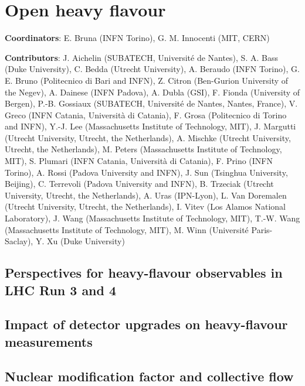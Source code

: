 \documentclass[../report.tex]{subfiles}
\providecommand{\main}{..}
\begin{document}
\clearpage
\section{Open heavy flavour}
\label{sec:HI_HF}

\begin{flushleft}
\textbf{Coordinators}: E. Bruna (INFN Torino), G. M. Innocenti (MIT, CERN)
\end{flushleft}
\textbf{Contributors}: 
J. Aichelin (SUBATECH, Universit\'e de Nantes),
S. A. Bass (Duke University),
C. Bedda (Utrecht University),
A. Beraudo (INFN Torino),
G. E. Bruno (Politecnico di Bari and INFN), 
Z. Citron (Ben-Gurion University of the Negev),
A. Dainese (INFN Padova),
A. Dubla (GSI),
F. Fionda (University of Bergen),
P.-B. Gossiaux (SUBATECH, Universit\'e de Nantes, Nantes, France),
V. Greco (INFN Catania, Universit\`a di Catania),
F. Grosa (Politecnico di Torino and INFN),
Y.-J. Lee (Massachusetts Institute of Technology, MIT),
J. Margutti (Utrecht University, Utrecht, the Netherlands),
A. Mischke (Utrecht University, Utrecht, the Netherlands),
M. Peters (Massachusetts Institute of Technology, MIT),
S. Plumari (INFN Catania, Universit\`a di Catania),
F. Prino (INFN Torino),
A. Rossi (Padova University and INFN),
J. Sun (Tsinghua University, Beijing),
C. Terrevoli (Padova University and INFN),
B. Trzeciak (Utrecht University, Utrecht, the Netherlands),
A. Uras (IPN-Lyon),
L. Van Doremalen (Utrecht University, Utrecht, the Netherlands),
I. Vitev (Los Alamos National Laboratory),
J. Wang (Massachusetts Institute of Technology, MIT),
T.-W. Wang (Massachusetts Institute of Technology, MIT),
M. Winn (Universit\'e Paris-Saclay),
Y. Xu (Duke University)



\subsection{Perspectives for heavy-flavour observables in LHC Run 3 and 4}


\subsection{Impact of detector upgrades on heavy-flavour measurements}


\subsection{Nuclear modification factor and collective flow}

\end{document}
